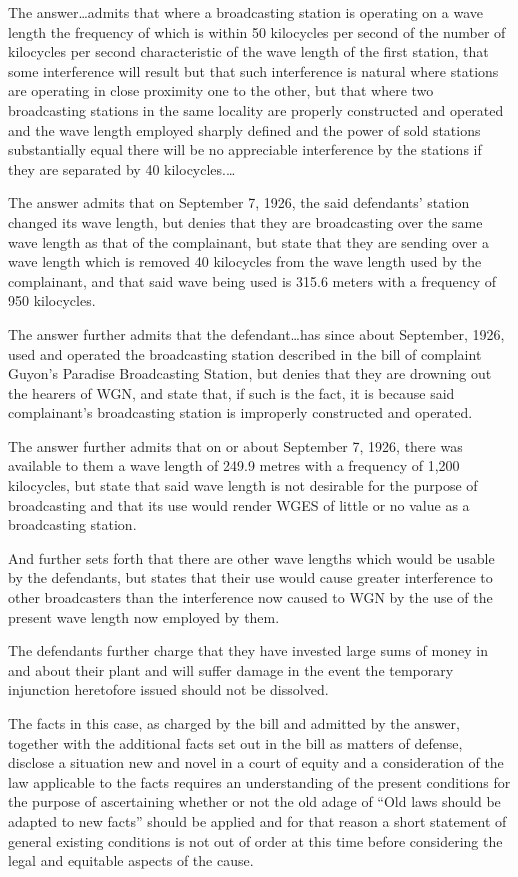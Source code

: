 The answer\ldots admits that where a broadcasting station is operating on  a
wave length the frequency of which is within 50 kilocycles per second of the
number of kilocycles per second characteristic of the wave length of the first
station, that some interference will result but that such interference is
natural where stations are operating in close proximity one to the other, but
that where two broadcasting stations in the same locality are properly
constructed and operated and the wave length employed sharply defined and the
power of sold stations substantially equal there will be no
appreciable interference by the stations if they are separated by 40
kilocycles.\ldots

The answer admits that on September 7, 1926, the said defendants' station
changed its wave length, but denies that they are broadcasting over the same
wave length as that of the complainant, but state that they are sending over a
wave length which is removed 40 kilocycles from the wave length used by the
complainant, and that said wave being used is 315.6 meters with a
frequency of 950 kilocycles.

The answer further admits that the defendant\ldots has since about September,
1926, used and operated the broadcasting station described in the bill of
complaint Guyon's Paradise Broadcasting Station, but denies that they are
drowning out the hearers of WGN, and state that, if such is the fact, it is
because said complainant's broadcasting station is improperly constructed and
operated.

The answer further admits that on or about September 7, 1926, there was
available to them a wave length of 249.9 metres with a frequency of 1,200
kilocycles, but state that said wave length is not desirable for the purpose of
broadcasting and that its use would render WGES of little or no value as a
broadcasting station.

And further sets forth that there are other wave lengths which would be usable
by the defendants, but states that their use would cause greater
interference to other broadcasters than the interference now caused to WGN by
the use of the present wave length now employed by them.

The defendants further charge that they have invested large sums of money in and
about their plant and will suffer damage in the event the temporary injunction
heretofore issued should not be dissolved.

The facts in this case, as charged by the bill and admitted by the answer,
together with the additional facts set out in the bill as matters of defense,
disclose a situation new and novel in a court of equity and a consideration of
the law applicable to the facts requires an understanding of the present
conditions for the purpose of ascertaining whether or not the old adage of
``Old laws should be adapted to new facts'' should be applied and for that
reason a short statement of general existing conditions is
not out of order at this time before considering the legal and equitable
aspects of the cause.

